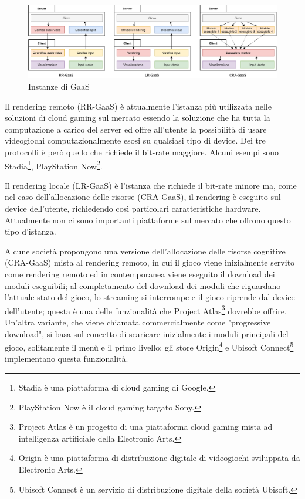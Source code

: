 \begin{figure}[H]
	\includegraphics[width=\linewidth]{immagini/GaaS}
	\caption{Instanze di GaaS}
	\label{fig:GaaS}
\end{figure}

Il rendering remoto (RR-GaaS) è attualmente l'istanza più utilizzata nelle soluzioni di cloud gaming sul mercato essendo la soluzione che ha tutta la computazione a carico del server ed offre all'utente la possibilità di usare videogiochi computazionalmente esosi su qualsiasi tipo di device. Dei tre protocolli è però quello che richiede il bit-rate maggiore. Alcuni esempi sono Stadia\footnote{Stadia è una piattaforma di cloud gaming di Google.}, PlayStation Now\footnote{PlayStation Now è il cloud gaming targato Sony.}.

Il rendering locale (LR-GaaS) è l'istanza che richiede il bit-rate minore ma, come nel caso dell'allocazione delle risorse (CRA-GaaS), il rendering è eseguito sul device dell'utente, richiedendo così particolari caratteristiche hardware. Attualmente non ci sono importanti piattaforme sul mercato che offrono questo tipo d'istanza.

Alcune società propongono una versione dell'allocazione delle risorse cognitive (CRA-GaaS) mista al rendering remoto, in cui il gioco viene inizialmente servito come rendering remoto ed in contemporanea viene eseguito il download dei moduli eseguibili; al completamento del download dei moduli che riguardano l'attuale stato del gioco, lo streaming si interrompe e il gioco riprende dal device dell'utente; questa è una delle funzionalità che Project Atlas\footnote{Project Atlas è un progetto di una piattaforma cloud gaming mista ad intelligenza artificiale della Electronic Arts.} dovrebbe offrire. Un'altra variante, che viene chiamata commercialmente come "progressive download", si basa sul concetto di scaricare inizialmente i moduli principali del gioco, solitamente il menù e il primo livello; gli store Origin\footnote{Origin è una piattaforma di distribuzione digitale di videogiochi sviluppata da Electronic Arts.} e Ubisoft Connect\footnote{Ubisoft Connect è un servizio di distribuzione digitale della società Ubisoft.} implementano questa funzionalità.

